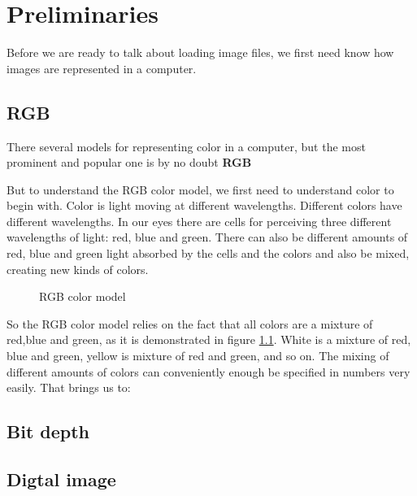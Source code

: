 \begin{comment}
  
\end{comment}

\chapter{Preliminaries}
\label{cha:preliminaries}

Before we are ready to talk about loading image files, we first need
know how images are represented in a computer.

\section{RGB}
\label{sec:rgb}

There several models for representing color in a computer, but the
most prominent and popular one is by no doubt \textbf{RGB} 

But to understand the RGB color model, we first need to understand
color to begin with. Color is light moving at different
wavelengths. Different colors have different wavelengths. In our eyes
there are cells for perceiving three different wavelengths of light:
red, blue and green. There can also be different amounts of red, blue
and green light absorbed by the cells and the colors and also be
mixed, creating new kinds of colors. \cite{neider93:_openg_progr_guide}

\begin{figure}[h]
  \centering
  
  \caption{RGB color model}
  \label{fig:rgb}
\end{figure}

So the RGB color model relies on the fact that all colors are a
mixture of red,blue and green, as it is demonstrated in figure
\ref{fig:rgb}. White is a mixture of red, blue and green, yellow is
mixture of red and green, and so on. The mixing of different amounts
of colors can conveniently enough be specified in numbers very
easily. That brings us to:

\section{Bit depth}
\label{sec:bit-depth}

\section{Digtal image}
\label{sec:digtal-image}


\printbibliography[heading=subbibliography]

